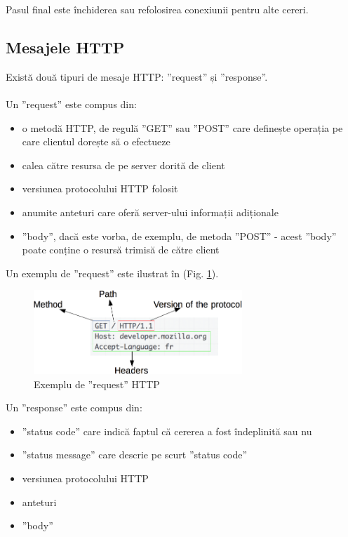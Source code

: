 Pasul final este închiderea sau refolosirea conexiunii pentru alte cereri.

\subsection{Mesajele HTTP}
Există două tipuri de mesaje HTTP: ”request” și ”response”.
\\ \\
Un ”request” este compus din:
\begin{itemize}
  \item o metodă HTTP, de regulă ”GET” sau ”POST” care definește operația pe care clientul dorește să o efectueze
  \item calea către resursa de pe server dorită de client
  \item versiunea protocolului HTTP folosit
  \item anumite anteturi care oferă server-ului informații adiționale
  \item ”body”, dacă este vorba, de exemplu, de metoda ”POST” - acest ”body” poate conține o resursă trimisă de către client
\end{itemize}

Un exemplu de ”request” este ilustrat în (Fig. \ref{fig:24}).

\begin{figure}[!htb]
	\centering
	\includegraphics[width=0.7\textwidth]
	{../LaTeX/Images/http_request.PNG}
	\caption{Exemplu de ”request” HTTP}
	\label{fig:24}
\end{figure}

Un ”response” este compus din:
\begin{itemize}
  \item ”status code” care indică faptul că cererea a fost îndeplinită sau nu
  \item ”status message” care descrie pe scurt ”status code”
  \item versiunea protocolului HTTP
  \item anteturi
  \item ”body”
\end{itemize}

